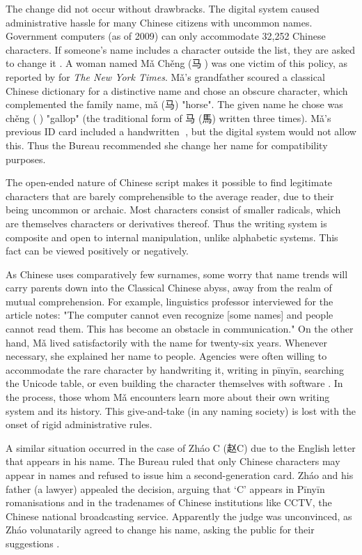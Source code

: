 The change did not occur without drawbracks. The digital system caused
administrative hassle for many Chinese citizens with uncommon names. Government
computers (as of 2009) can only accommodate 32,252 Chinese characters. If
someone's name includes a character outside the list, they are asked to change
it \parencite{lafraniere09}. A woman named Mǎ Chěng ({\zafont 马}{\zbfont 𩧢})
was one victim of this policy, as reported by \textcite{lafraniere09} for
\textit{The New York Times}. Mǎ's grandfather scoured a classical Chinese
dictionary for a distinctive name and chose an obscure character, which
complemented the family name, mǎ ({\zafont 马}) "horse". The given name he
chose was chěng ({\zbfont 𩧢}) "gallop" (the traditional form of {\zafont 马}
({\zafont 馬}) written three times). Mǎ's previous ID card included a
handwritten {\zbfont 𩧢}, but the digital system would not allow this. Thus the
Bureau recommended she change her name for compatibility purposes.

The open-ended nature of Chinese script makes it possible to find legitimate
characters that are barely comprehensible to the average reader, due to their
being uncommon or archaic. Most characters consist of smaller radicals, which
are themselves characters or derivatives thereof. Thus the writing system is
composite and open to internal manipulation, unlike alphabetic systems. This
fact can be viewed positively or negatively.

As Chinese uses comparatively few surnames, some worry that name trends will
carry parents down into the Classical Chinese abyss, away from the realm of
mutual comprehension. For example, linguistics professor interviewed for the
\textcite{lafraniere09} article notes: "The computer cannot even recognize
[some names] and people cannot read them. This has become an obstacle in
communication." On the other hand, Mǎ lived satisfactorily with the name for
twenty-six years. Whenever necessary, she explained her name to people.
Agencies were often willing to accommodate the rare character by handwriting
it, writing in pīnyīn, searching the Unicode table, or even building the
character themselves with software \parencite{martinsen08}. In the process,
those whom Mǎ encounters learn more about their own writing system and its
history. This give-and-take (in any naming society) is lost with the onset of
rigid administrative rules.

A similar situation occurred in the case of Zháo C ({\zafont 赵}C) due to the
English letter that appears in his name. The Bureau ruled that only Chinese
characters may appear in names and refused to issue him a second-generation
card. Zháo and his father (a lawyer) appealed the decision, arguing that `C'
appears in Pīnyīn romanisations and in the tradenames of Chinese institutions
like CCTV, the Chinese national broadcasting service. Apparently the judge was
unconvinced, as Zháo volunatarily agreed to change his name, asking the public
for their suggestions \parencite{martinsen09}.


